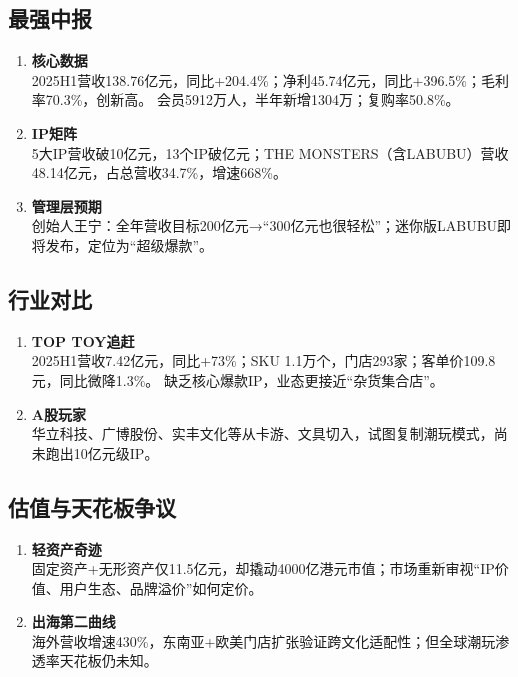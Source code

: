 \subsection{最强中报}
\begin{enumerate}[leftmargin=*, nosep]
    \item \textbf{核心数据}  \\
    2025H1营收138.76亿元，同比+204.4\%；净利45.74亿元，同比+396.5\%；毛利率70.3\%，创新高。  
    会员5912万人，半年新增1304万；复购率50.8\%。
    \item \textbf{IP矩阵}  \\
    5大IP营收破10亿元，13个IP破亿元；THE MONSTERS（含LABUBU）营收48.14亿元，占总营收34.7\%，增速668\%。
    \item \textbf{管理层预期}  \\
    创始人王宁：全年营收目标200亿元→“300亿元也很轻松”；迷你版LABUBU即将发布，定位为“超级爆款”。
\end{enumerate}

\subsection{行业对比}
\begin{enumerate}[leftmargin=*, nosep]
    \item \textbf{TOP TOY追赶}  \\
    2025H1营收7.42亿元，同比+73\%；SKU 1.1万个，门店293家；客单价109.8元，同比微降1.3\%。  
    缺乏核心爆款IP，业态更接近“杂货集合店”。
    \item \textbf{A股玩家}  \\
    华立科技、广博股份、实丰文化等从卡游、文具切入，试图复制潮玩模式，尚未跑出10亿元级IP。
\end{enumerate}

\subsection{估值与天花板争议}
\begin{enumerate}[leftmargin=*, nosep]
    \item \textbf{轻资产奇迹}  \\
    固定资产+无形资产仅11.5亿元，却撬动4000亿港元市值；市场重新审视“IP价值、用户生态、品牌溢价”如何定价。
    \item \textbf{出海第二曲线}  \\
    海外营收增速430\%，东南亚+欧美门店扩张验证跨文化适配性；但全球潮玩渗透率天花板仍未知。
\end{enumerate}

